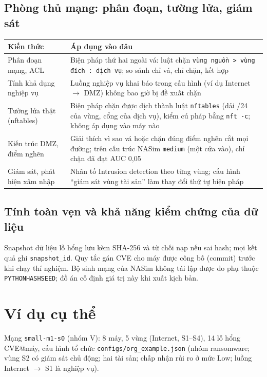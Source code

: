 \documentclass[11pt,a4paper]{article}
\begin{document}
\subsection{Phòng thủ mạng: phân đoạn, tường lửa, giám sát}

\begin{center}
\small
\begin{tabular}{@{}Y{3.6cm}Y{12.4cm}@{}}
\toprule
\textbf{Kiến thức} & \textbf{Áp dụng vào đâu} \\
\midrule
Phân đoạn mạng, ACL & Biện pháp thứ hai ngoài vá: luật chặn \texttt{vùng nguồn > vùng đích : dịch vụ}; so sánh chỉ vá, chỉ chặn, kết hợp \\
Tính khả dụng nghiệp vụ & Luồng nghiệp vụ khai báo trong cấu hình (ví dụ Internet $\to$ DMZ) không bao giờ bị đề xuất chặn \\
Tường lửa thật (nftables) & Biện pháp chặn được dịch thành luật \texttt{nftables} (dải /24 của vùng, cổng của dịch vụ), kiểm cú pháp bằng \texttt{nft -c}; không áp dụng vào máy nào \\
Kiến trúc DMZ, điểm nghẽn & Giải thích vì sao vá hoặc chặn đúng điểm nghẽn cắt mọi đường; trên cấu trúc NASim \texttt{medium} (một cửa vào), chỉ chặn đã đạt AUC 0,05 \\
Giám sát, phát hiện xâm nhập & Nhân tố Intrusion detection theo từng vùng; cấu hình ``giám sát vùng tài sản'' làm thay đổi thứ tự biện pháp \\
\bottomrule
\end{tabular}
\end{center}

\subsection{Tính toàn vẹn và khả năng kiểm chứng của dữ liệu}

Snapshot dữ liệu lỗ hổng lưu kèm SHA-256 và từ chối nạp nếu sai hash; mọi kết quả ghi \texttt{snapshot\_id}. Quy tắc gán CVE cho máy được công bố (commit) trước khi chạy thí nghiệm. Bộ sinh mạng của NASim không tái lập được do phụ thuộc \texttt{PYTHONHASHSEED}; đồ án cố định giá trị này khi xuất kịch bản.

\section{Ví dụ cụ thể}

Mạng \texttt{small-m1-s0} (nhóm V): 8 máy, 5 vùng (Internet, S1--S4), 14 lỗ hổng CVE@máy, cấu hình tổ chức \texttt{configs/org\_example.json} (nhóm ransomware; vùng S2 có giám sát chủ động; hai tài sản; chấp nhận rủi ro ở mức Low; luồng Internet $\to$ S1 là nghiệp vụ).
\end{document}
